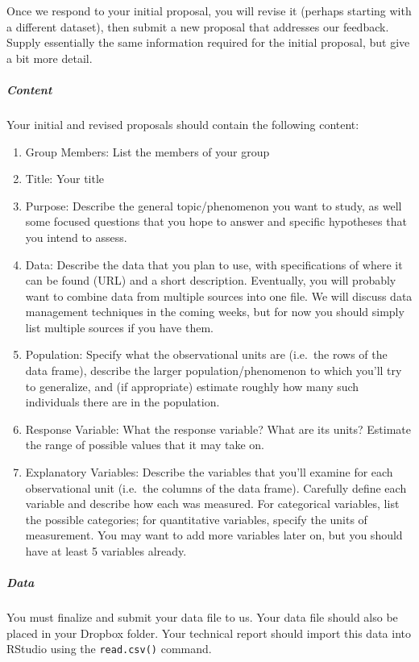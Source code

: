 \documentclass[]{article}
\let\oldsubparagraph\subparagraph
\renewcommand{\subparagraph}[1]{\oldsubparagraph{#1}\mbox{}}
\begin{document}
Once we respond to your initial proposal, you will revise it (perhaps
starting with a different dataset), then submit a new proposal that
addresses our feedback. Supply essentially the same information required
for the initial proposal, but give a bit more detail.

\subparagraph{Content}\label{content}

Your initial and revised proposals should contain the following content:

\begin{enumerate}
\def\labelenumi{\arabic{enumi}.}
\item
  Group Members: List the members of your group
\item
  Title: Your title
\item
  Purpose: Describe the general topic/phenomenon you want to study, as
  well some focused questions that you hope to answer and specific
  hypotheses that you intend to assess.
\item
  Data: Describe the data that you plan to use, with specifications of
  where it can be found (URL) and a short description. Eventually, you
  will probably want to combine data from multiple sources into one
  file. We will discuss data management techniques in the coming weeks,
  but for now you should simply list multiple sources if you have them.
\item
  Population: Specify what the observational units are (i.e.~the rows of
  the data frame), describe the larger population/phenomenon to which
  you'll try to generalize, and (if appropriate) estimate roughly how
  many such individuals there are in the population.
\item
  Response Variable: What the response variable? What are its units?
  Estimate the range of possible values that it may take on.
\item
  Explanatory Variables: Describe the variables that you'll examine for
  each observational unit (i.e.~the columns of the data frame).
  Carefully define each variable and describe how each was measured. For
  categorical variables, list the possible categories; for quantitative
  variables, specify the units of measurement. You may want to add more
  variables later on, but you should have at least 5 variables already.
\end{enumerate}

\subparagraph{Data}\label{data}

You must finalize and submit your data file to us. Your data file should
also be placed in your Dropbox folder. Your technical report should
import this data into RStudio using the \texttt{read.csv()} command.
\end{document}
